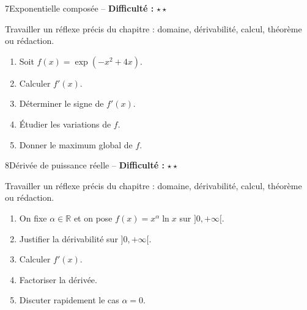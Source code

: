 \documentclass[11pt,a4paper]{article}
\newcommand{\R}{\mathbb{R}}
\newcommand{\etoiles}[1]{\textbf{Difficulté :} #1}
\begin{document}
\begin{exobox}{7}{Exponentielle composée -- \etoiles{$\star\star$}}

\begin{objectifbox}
Travailler un réflexe précis du chapitre : domaine, dérivabilité, calcul, théorème ou rédaction.
\end{objectifbox}

\begin{enumerate}

\item Soit $f(x)=\exp(-x^2+4x)$.

\item Calculer $f'(x)$.

\item Déterminer le signe de $f'(x)$.

\item Étudier les variations de $f$.

\item Donner le maximum global de $f$.

\end{enumerate}

\end{exobox}


\begin{exobox}{8}{Dérivée de puissance réelle -- \etoiles{$\star\star$}}

\begin{objectifbox}
Travailler un réflexe précis du chapitre : domaine, dérivabilité, calcul, théorème ou rédaction.
\end{objectifbox}

\begin{enumerate}

\item On fixe $\alpha\in\R$ et on pose $f(x)=x^\alpha\ln x$ sur $]0,+\infty[$.

\item Justifier la dérivabilité sur $]0,+\infty[$.

\item Calculer $f'(x)$.

\item Factoriser la dérivée.

\item Discuter rapidement le cas $\alpha=0$.

\end{enumerate}

\end{exobox}
\end{document}
